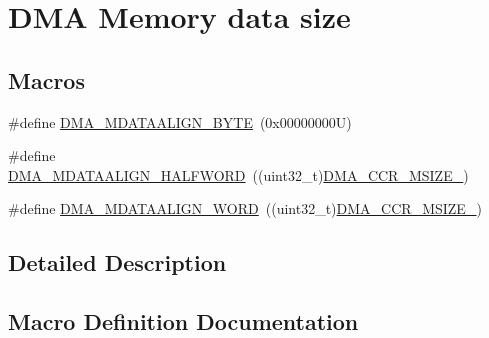 \hypertarget{group___d_m_a___memory__data__size}{}\section{D\+MA Memory data size}
\label{group___d_m_a___memory__data__size}
\subsection*{Macros}
\begin{DoxyCompactItemize}
\item 
\#define \hyperlink{group___d_m_a___memory__data__size_ga9ed07bddf736298eba11508382ea4d51}{D\+M\+A\+\_\+\+M\+D\+A\+T\+A\+A\+L\+I\+G\+N\+\_\+\+B\+Y\+TE}~(0x00000000\+U)
\item 
\#define \hyperlink{group___d_m_a___memory__data__size_ga2c7355971c0da34a7ffe50ec87403071}{D\+M\+A\+\_\+\+M\+D\+A\+T\+A\+A\+L\+I\+G\+N\+\_\+\+H\+A\+L\+F\+W\+O\+RD}~((uint32\+\_\+t)\hyperlink{group___peripheral___registers___bits___definition_ga600d3f8200fc42ea6e1c7c8abbd327ad}{D\+M\+A\+\_\+\+C\+C\+R\+\_\+\+M\+S\+I\+Z\+E\+\_})
\item 
\#define \hyperlink{group___d_m_a___memory__data__size_ga8812da819f18c873249074f3920220b2}{D\+M\+A\+\_\+\+M\+D\+A\+T\+A\+A\+L\+I\+G\+N\+\_\+\+W\+O\+RD}~((uint32\+\_\+t)\hyperlink{group___peripheral___registers___bits___definition_ga60b9958fbde96f69160ca7edf92d4c27}{D\+M\+A\+\_\+\+C\+C\+R\+\_\+\+M\+S\+I\+Z\+E\+\_})
\end{DoxyCompactItemize}


\subsection{Detailed Description}


\subsection{Macro Definition Documentation}
\mbox{\label{group___d_m_a___memory__data__size_ga9ed07bddf736298eba11508382ea4d51}} 
